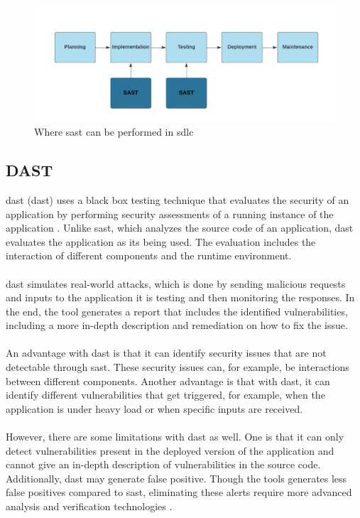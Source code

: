 \vspace{2mm}
\begin{figure}[H]
    \centering
    \includegraphics[width=0.8\columnwidth]{Images/sast.png}
    \caption{Where \acrshort{sast} can be performed in \acrshort{sdlc}}
    \label{fig: Where SAST can be performed in SDLC}
\end{figure}

\subsection{DAST}
\acrlong{dast} (\acrshort{dast}) uses a black box testing technique that evaluates the security of an application by performing security assessments of a running instance of the application \cite{dast}. Unlike \acrshort{sast}, which analyzes the source code of an application, \acrshort{dast} evaluates the application as its being used. The evaluation includes the interaction of different components and the runtime environment. 
\\~\\
\acrshort{dast} simulates real-world attacks, which is done by sending malicious requests and inputs to the application it is testing and then monitoring the responses. In the end, the tool generates a report that includes the identified vulnerabilities, including a more in-depth description and remediation on how to fix the issue. 
\\~\\
An advantage with \acrshort{dast} is that it can identify security issues that are not detectable through \acrshort{sast}. These security issues can, for example, be interactions between different components. Another advantage is that with \acrshort{dast}, it can identify different vulnerabilities that get triggered, for example, when the application is under heavy load or when specific inputs are received.
\\~\\
However, there are some limitations with \acrshort{dast} as well. One is that it can only detect vulnerabilities present in the deployed version of the application and cannot give an in-depth description of vulnerabilities in the source code. Additionally, \acrshort{dast} may generate false positive. Though the tools generates less false positives compared to \acrshort{sast}, eliminating these alerts require more advanced analysis and verification technologies \cite{DastFalsePositives}.
